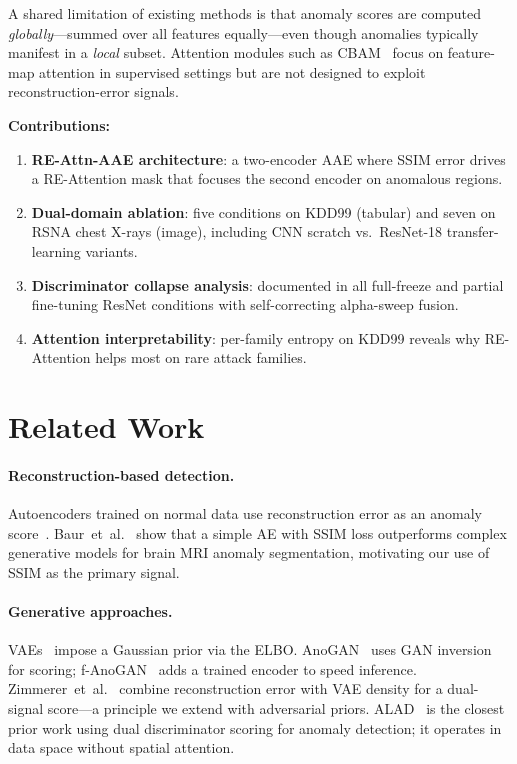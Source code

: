 \documentclass[11pt,a4paper]{article}
\newcommand{\method}{RE-Attn-AAE}
\begin{document}
A shared limitation of existing methods is that anomaly scores are computed
\emph{globally}—summed over all features equally—even though anomalies typically
manifest in a \emph{local} subset.
Attention modules such as CBAM~\cite{woo_cbam_2018} focus on feature-map attention
in supervised settings but are not designed to exploit reconstruction-error signals.

\textbf{Contributions:}
\begin{enumerate}[leftmargin=*,label=\textbf{\arabic*.}]
  \item \textbf{\method{} architecture}: a two-encoder AAE where SSIM error drives
        a RE-Attention mask that focuses the second encoder on anomalous regions.
  \item \textbf{Dual-domain ablation}: five conditions on KDD99 (tabular) and
        seven on RSNA chest X-rays (image), including CNN scratch vs.\ ResNet-18
        transfer-learning variants.
  \item \textbf{Discriminator collapse analysis}: documented in all full-freeze and
        partial fine-tuning ResNet conditions with self-correcting alpha-sweep fusion.
  \item \textbf{Attention interpretability}: per-family entropy on KDD99 reveals
        why RE-Attention helps most on rare attack families.
\end{enumerate}

\section{Related Work}

\paragraph{Reconstruction-based detection.}
Autoencoders trained on normal data use reconstruction error as an anomaly
score~\cite{chalapathy_survey_2019,pang_survey_2021}.
Baur~et~al.~\cite{baur_ae_survey_2021} show that a simple AE with SSIM loss
outperforms complex generative models for brain MRI anomaly segmentation,
motivating our use of SSIM as the primary signal.

\paragraph{Generative approaches.}
VAEs~\cite{kingma_vae_2013} impose a Gaussian prior via the ELBO.
AnoGAN~\cite{schlegl_anogan_2017} uses GAN inversion for scoring;
f-AnoGAN~\cite{schlegl_fanogan_2019} adds a trained encoder to speed inference.
Zimmerer~et~al.~\cite{zimmerer_cevae_2019} combine reconstruction error with VAE
density for a dual-signal score—a principle we extend with adversarial priors.
ALAD~\cite{zenati_alad_2018} is the closest prior work using dual discriminator
scoring for anomaly detection; it operates in data space without spatial attention.
\end{document}
